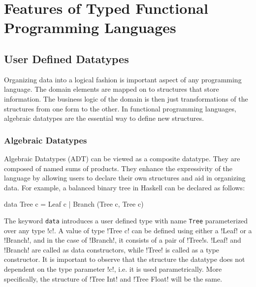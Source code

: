 \documentclass[manuscript,screen,nonacm]{acmart}
\begin{document}



\section{Features of Typed Functional Programming Languages}\label{sec:language-features}
\subsection{User Defined Datatypes}
Organizing data into a logical fashion is important aspect of any programming language. The domain elements are mapped on to structures that store information. The business logic of the domain is then just transformations of the structures from one form to the other. In functional programming languages, algebraic datatypes are the essential way to define new structures.

\subsubsection{Algebraic Datatypes}
Algebraic Datatypes (ADT) can be viewed as a composite datatype. They are composed of named sums of products. They enhance the expressivity of the language by allowing users to declare their own structures and aid in organizing data. For example, a balanced binary tree in Haskell can be declared as follows:

\begin{code}
  data Tree c = Leaf c | Branch (Tree c, Tree c)
\end{code}

The keyword \lstinline{data} introduces a user defined type with name \lstinline{Tree} parameterized over any type !c!. A value of type !Tree c! can be defined using either a !Leaf! or a !Branch!, and in the case of !Branch!, it consists of a pair of !Tree!s. !Leaf! and !Branch! are called as data constructors, while !Tree! is called as a type constructor. It is important to observe that the structure the datatype does not dependent on the type parameter !c!, i.e. it is used parametrically. More specifically, the structure of !Tree Int! and !Tree Float! will be the same.
\end{document}
